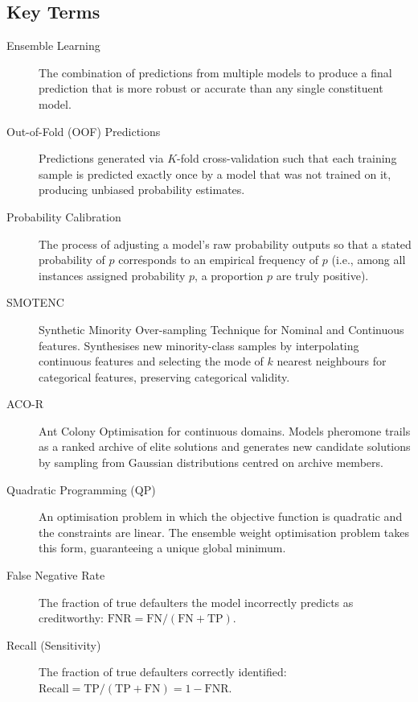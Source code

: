 \documentclass[12pt,a4paper]{article}
\begin{document}
\subsection{Key Terms}

\begin{description}
    \item[Ensemble Learning] The combination of predictions from multiple models to produce a final prediction that is more robust or accurate than any single constituent model.
    \item[Out-of-Fold (OOF) Predictions] Predictions generated via $K$-fold cross-validation such that each training sample is predicted exactly once by a model that was not trained on it, producing unbiased probability estimates.
    \item[Probability Calibration] The process of adjusting a model's raw probability outputs so that a stated probability of $p$ corresponds to an empirical frequency of $p$ (i.e., among all instances assigned probability $p$, a proportion $p$ are truly positive).
    \item[SMOTENC] Synthetic Minority Over-sampling Technique for Nominal and Continuous features. Synthesises new minority-class samples by interpolating continuous features and selecting the mode of $k$ nearest neighbours for categorical features, preserving categorical validity.
    \item[ACO-R] Ant Colony Optimisation for continuous domains. Models pheromone trails as a ranked archive of elite solutions and generates new candidate solutions by sampling from Gaussian distributions centred on archive members.
    \item[Quadratic Programming (QP)] An optimisation problem in which the objective function is quadratic and the constraints are linear. The ensemble weight optimisation problem takes this form, guaranteeing a unique global minimum.
    \item[False Negative Rate] The fraction of true defaulters the model incorrectly predicts as creditworthy: $\text{FNR} = \text{FN} / (\text{FN} + \text{TP})$.
    \item[Recall (Sensitivity)] The fraction of true defaulters correctly identified: $\text{Recall} = \text{TP} / (\text{TP} + \text{FN}) = 1 - \text{FNR}$.
\end{description}


\end{document}
